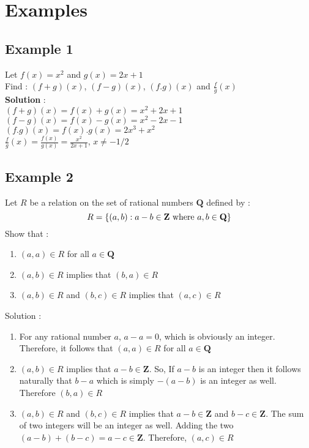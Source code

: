 \documentclass[12pt, letterpaper]{article}
\begin{document}
\section{Examples}
\subsection{Example 1}
Let $f(x) = x^2$ and $g(x) = 2x+1$ \\
Find : $(f+g)(x)$, $(f-g)(x)$, $(f.g)(x)$ and $\frac{f}{g}(x)$\\
\textbf{Solution} :\\
$(f+g) (x) = f(x) + g(x) = x^2 + 2x + 1$ \\
$(f-g) (x) = f(x) - g(x) = x^2 - 2x -1$ \\
$(f.g) (x) = f(x) . g(x) = 2x^3 + x^2$ \\
$\frac{f}{g}(x) = \frac{f(x)}{g(x)} = \frac{x^2}{2x+1}$, $x \neq -1/2$

\subsection{Example 2}
Let $R$ be a relation on the set of rational numbers $\mathbf{Q}$ defined by : 
\begin{displaymath}
R = \{(a,b) : a-b \in \mathbf{Z} \textnormal{ where }a,b \in \mathbf{Q}\}
\end{displaymath}
Show that : 
\begin{enumerate}
    \item $(a,a) \in R$ for all $a \in \mathbf{Q}$
    \item $(a,b) \in R$ implies that $(b,a) \in R$
    \item $(a,b) \in R$ and $(b,c) \in R$ implies that $(a,c) \in R$
\end{enumerate}
Solution : 
\begin{enumerate}
    \item For any rational number $a$, $a-a = 0$, which is obviously an integer. Therefore, it follows that $(a,a) \in R$ for all $a \in \mathbf{Q}$
    \item $(a,b) \in R$ implies that $a-b \in \mathbf{Z}$. So, If $a-b$ is an integer then it follows naturally that $b-a$ which is simply $-(a-b)$ is an integer as well. Therefore $(b,a) \in R$
    \item $(a,b) \in R$ and $(b,c) \in R$ implies that $a-b \in \mathbf{Z}$ and $b-c \in \mathbf{Z}$. The sum of two integers will be an integer as well. Adding the two $(a-b) + (b-c) = a-c \in \mathbf{Z}$. Therefore, $(a,c) \in R$  
\end{enumerate}
\end{document}

